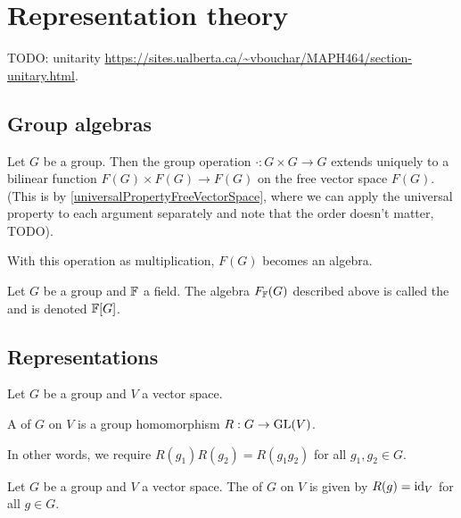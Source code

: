 \section{Representation theory}
TODO: unitarity \url{https://sites.ualberta.ca/~vbouchar/MAPH464/section-unitary.html}.
\subsection{Group algebras}
Let $G$ be a group. Then the group operation $\cdot: G\times G\to G$ extends uniquely to a bilinear function $F(G)\times F(G) \to F(G)$ on the free vector space $F(G)$. (This is by \ref{universalPropertyFreeVectorSpace}, where we can apply the universal property to each argument separately and note that the order doesn't matter, TODO).

With this operation as multiplication, $F(G)$ becomes an algebra.

\begin{definition}
Let $G$ be a group and $\mathbb{F}$ a field. The algebra $F_{\mathbb{F}}(G)$ described above is called the  and is denoted $\mathbb{F}[G]$.
\end{definition}

\subsection{Representations}

\begin{definition}
Let $G$ be a group and $V$ a vector space. 

A  of $G$ on $V$ is a group homomorphism $R: G\to \operatorname{GL}(V)$.
\end{definition}
In other words, we require $R(g_1)R(g_2) = R(g_1g_2)$ for all $g_1,g_2\in G$.

\begin{example}
Let $G$ be a group and $V$ a vector space. The  of $G$ on $V$ is given by $R(g) = \operatorname{id}_V$ for all $g\in G$.
\end{example}

